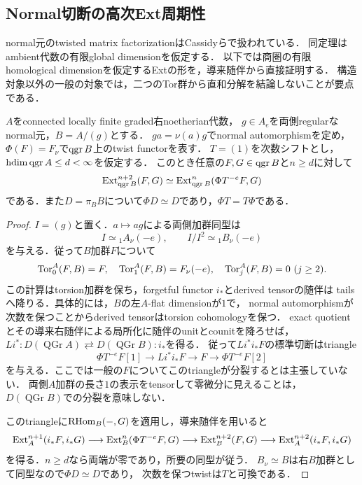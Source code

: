 \documentclass[11pt,a4paper]{ltjsarticle}
\begin{document}
\subsection{Normal切断の高次Ext周期性}
\label{subsec:normal-high-ext}

normal元のtwisted matrix factorizationはCassidyら\cite[Theorem 4.2]{CCKM}で扱われている．
同定理はambient代数の有限global dimensionを仮定する．
以下では商圏の有限homological dimensionを仮定するExtの形を，導来随伴から直接証明する．
構造対象以外の一般の対象では，二つのTor群から直和分解を結論しないことが要点である．

\begin{lemma}[Normal切断の高次Ext周期性]
\label{lem:v6-normal-ext-periodicity}
$A$をconnected locally finite graded右noetherian代数，
$g\in A_e$を両側regularなnormal元，$B=A/(g)$とする．
$ga=\nu(a)g$でnormal automorphismを定め，
$\Phi(F)=F_\nu$で$\operatorname{qgr} B$上のtwist functorを表す．
$T=(1)$を次数シフトとし，$\operatorname{hdim}\operatorname{qgr} A\leq d<\infty$を仮定する．
このとき任意の$F,G\in\operatorname{qgr} B$と$n\geq d$に対して
\[
 \operatorname{Ext}^{n+2}_{\operatorname{qgr} B}(F,G)
 \simeq \operatorname{Ext}^n_{\operatorname{qgr} B}(\Phi T^{-e}F,G)
\]
である．また$D=\pi_B B$について$\Phi D\simeq D$であり，$\Phi T=T\Phi$である．
\end{lemma}
\begin{proof}
$I=(g)$と置く．$a\mapsto ag$による両側加群同型は
\[
 I\simeq {}_1A_\nu(-e),\qquad
 I/I^2\simeq {}_1B_\nu(-e)
\]
を与える．従って$B$加群$F$について
\[
 \operatorname{Tor}^A_0(F,B)=F,\quad
 \operatorname{Tor}^A_1(F,B)=F_\nu(-e),\quad
 \operatorname{Tor}^A_j(F,B)=0\ (j\geq2).
\]
この計算はtorsion加群を保ち，forgetful functor $i_*$とderived tensorの随伴は
tailsへ降りる．具体的には，$B$の左$A$-flat dimensionが$1$で，
normal automorphismが次数を保つことからderived tensorはtorsion cohomologyを保つ．
exact quotientとその導来右随伴による局所化に随伴のunitとcounitを降ろせば，
$Li^*:D(\operatorname{QGr}A)\rightleftarrows D(\operatorname{QGr}B):i_*$を得る．
従って$Li^*i_*F$の標準切断はtriangle
\[
 \Phi T^{-e}F[1]\longrightarrow Li^*i_*F\longrightarrow F
 \longrightarrow\Phi T^{-e}F[2]
\]
を与える．ここでは一般の$F$についてこのtriangleが分裂するとは主張していない．
両側$A$加群の長さ$1$の表示をtensorして零微分に見えることは，
$D(\operatorname{QGr}B)$での分裂を意味しない．

このtriangleに$\operatorname{RHom}_B(-,G)$を適用し，導来随伴を用いると
\[
 \operatorname{Ext}_A^{n+1}(i_*F,i_*G)\longrightarrow
 \operatorname{Ext}_B^n(\Phi T^{-e}F,G)\longrightarrow
 \operatorname{Ext}_B^{n+2}(F,G)\longrightarrow
 \operatorname{Ext}_A^{n+2}(i_*F,i_*G)
\]
を得る．$n\geq d$なら両端が零であり，所要の同型が従う．
$B_\nu\simeq B$は右$B$加群として同型なので$\Phi D\simeq D$であり，
次数を保つtwistは$T$と可換である．
\end{proof}
\end{document}

